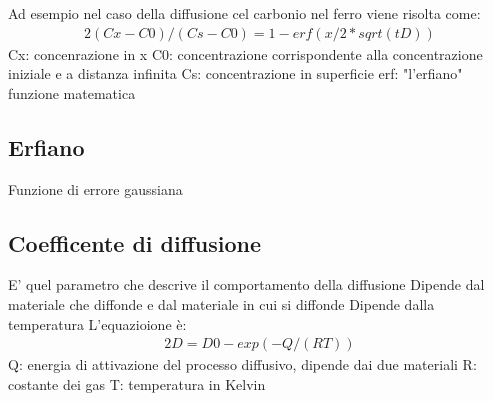 \documentclass{article}%
\begin{document}
%
Ad esempio nel caso della diffusione cel carbonio nel ferro viene risolta come:\newline%
%
\newline%
%
\begin{alignat}{2}%
(Cx - C0) / (Cs - C0) = 1 - erf(x / 2*sqrt(tD))
%
\end{alignat}%
\newline%
%
Cx: concenrazione in x\newline%
%
C0: concentrazione corrispondente alla concentrazione iniziale e a distanza infinita\newline%
%
Cs: concentrazione in superficie\newline%
%
erf: "l'erfiano" funzione matematica\newline%
%
\newline%

%
\subsection{ Erfiano }%
\label{subsec:Erfiano}%
Funzione di errore gaussiana\newline%
%
\newline%

%
\subsection{ Coefficente di diffusione }%
\label{subsec:Coefficentedidiffusione}%
E' quel parametro che descrive il comportamento della diffusione\newline%
%
Dipende dal materiale che diffonde e dal materiale in cui si diffonde\newline%
%
Dipende dalla temperatura\newline%
%
L'equazioione è:\newline%
%
\begin{alignat}{2}%
D = D0 - exp(- Q/(RT))
%
\end{alignat}%
\newline%
%
Q: energia di attivazione del processo diffusivo, dipende dai due materiali\newline%
%
R: costante dei gas\newline%
%
T: temperatura in Kelvin\newline%
%
\newline%

%
\end{document}
